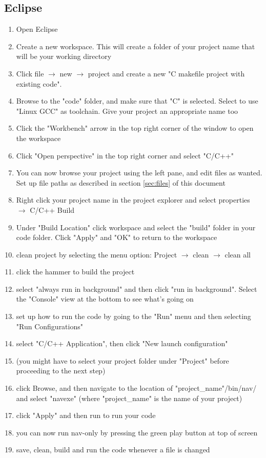 \documentclass[10pt,a4paper]{article}
\begin{document}
\subsection{Eclipse}
\begin{enumerate}
\item Open Eclipse
\item Create a new workspace. This will create a folder of your project name that will be your working directory
\item Click file $\rightarrow$ new $\rightarrow$ project and create a new "C makefile project with existing code".
\item Browse to the "code" folder, and make sure that "C" is selected. Select to use "Linux GCC" as toolchain. Give your project an appropriate name too
\item Click the "Workbench" arrow in the top right corner of the window to open the workspace
\item Click "Open perspective" in the top right corner and select "C/C++"
\item You can now browse your project using the left pane, and edit files as wanted. Set up file paths as described in section \ref{sec:files} of this document
\item Right click your project name in the project explorer and select properties $\rightarrow$ C/C++ Build
\item Under "Build Location" click workspace and select the "build" folder in your code folder. Click "Apply" and "OK" to return to the workspace
\item clean project by selecting the menu option: Project $\rightarrow$ clean $\rightarrow$ clean all
\item click the hammer to build the project
\item select "always run in background" and then click "run in background". Select the "Console" view at the bottom to see what's going on
\item set up how to run the code by going to the "Run" menu and then selecting "Run Configurations"
\item select "C/C++ Application", then click "New launch configuration"
\item (you might have to select your project folder under "Project" before proceeding to the next step)
\item click Browse, and then navigate to the location of "project\_name"/bin/nav/ and select "navexe" (where "project\_name" is the name of your project)
\item click "Apply" and then run to run your code
\item you can now run nav-only by pressing the green play button at top of screen
\item save, clean, build and run the code whenever a file is changed
\end{enumerate}
\end{document}
